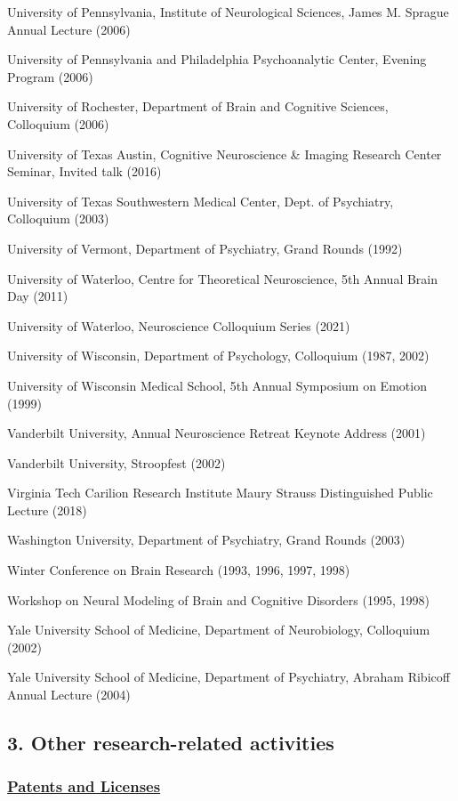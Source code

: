 \documentclass[10 pt]{article}
\begin{document}
University of Pennsylvania, Institute of Neurological Sciences, James M. Sprague Annual Lecture (2006)

University of Pennsylvania and Philadelphia Psychoanalytic Center, Evening Program (2006)

University of Rochester, Department of Brain and Cognitive Sciences, Colloquium (2006)

University of Texas Austin, Cognitive Neuroscience \& Imaging Research Center Seminar, Invited talk (2016)

University of Texas Southwestern Medical Center, Dept. of Psychiatry, Colloquium (2003)

University of Vermont, Department of Psychiatry, Grand Rounds (1992)

University of Waterloo, Centre for Theoretical Neuroscience, 5th Annual Brain Day (2011)

University of Waterloo, Neuroscience Colloquium Series (2021)

University of Wisconsin, Department of Psychology, Colloquium (1987, 2002)

University of Wisconsin Medical School, 5th Annual Symposium on Emotion (1999)

Vanderbilt University, Annual Neuroscience Retreat Keynote Address (2001)

Vanderbilt University, Stroopfest (2002)

Virginia Tech Carilion Research Institute Maury Strauss Distinguished Public Lecture (2018)

Washington University, Department of Psychiatry, Grand Rounds (2003)

Winter Conference on Brain Research (1993, 1996, 1997, 1998)

Workshop on Neural Modeling of Brain and Cognitive Disorders (1995, 1998)

Yale University School of Medicine, Department of Neurobiology, Colloquium (2002)

Yale University School of Medicine, Department of Psychiatry, Abraham Ribicoff Annual Lecture (2004)


\subsection*{3. Other research-related activities} \label{secRAPA3}
    \smallskip

\subsubsection*{\underline{Patents and Licenses}} \label{secPaL}
    \smallskip
\end{document}
